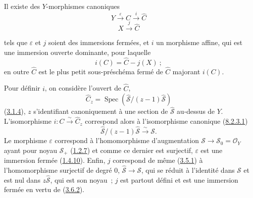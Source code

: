 \begin{proposition}[8.3.2]
\label{II.8.3.2-fr}
Il existe des $Y$-morphismes canoniques
\begin{equation}
\label{II.8.3.2.1-fr}
  Y\xrightarrow{\varepsilon}C\xrightarrow{i}\widehat{C}
\tag{8.3.2.1}
\end{equation}
\begin{equation}
\label{II.8.3.2.2-fr}
  X\xrightarrow{j}\widehat{C}
\tag{8.3.2.2}
\end{equation}

tels que $\varepsilon$ et $j$ soient des immersions fermées, et $i$ un
morphisme affine, qui est une immersion ouverte dominante, pour laquelle
\begin{equation}
\label{II.8.3.2.3-fr}
  i(C)=\widehat{C}-j(X)~;
\tag{8.3.2.3}
\end{equation}
en outre $\widehat{C}$ est le plus petit sous-préschéma fermé de $\widehat{C}$
majorant $i(C)$.
\end{proposition}

Pour définir $i$, on considère l'ouvert de $\widehat{C}$,
\begin{equation}
\label{II.8.3.2.4-fr}
  \widehat{C}_z=
  \operatorname{Spec}(\widehat{\mathcal{S}}/(z-1)\widehat{\mathcal{S}})
\tag{8.3.2.4}
\end{equation}
(\hyperref[II.3.1.4-fr]{3.1.4}), $z$ s'identifiant canoniquement à une
section de $\widehat{\mathcal{S}}$ au-dessus de $Y$. L'isomorphisme
$i:C\xrightarrow{\sim}\widehat{C}_z$ correspond alors à l'isomorphisme
canonique (\hyperref[II.8.2.3.1-fr]{8.2.3.1})
\[
  \widehat{\mathcal{S}}/(z-1)\widehat{\mathcal{S}}
  \xrightarrow{\sim}\mathcal{S}.
\]
Le morphisme $\varepsilon$ correspond à l'homomorphisme d'augmentation
$\mathcal{S}\to\mathcal{S}_0=\mathcal{O}_Y$ ayant pour noyau
$\mathcal{S}_+$ (\hyperref[II.1.2.7-fr]{1.2.7}) et comme ce dernier est
surjectif, $\varepsilon$ est une immersion fermée
(\hyperref[II.1.4.10-fr]{1.4.10}). Enfin, $j$ correspond de même
(\hyperref[II.3.5.1-fr]{3.5.1}) à l'homomorphisme surjectif de degré $0$,
$\widehat{\mathcal{S}}\to\mathcal{S}$, qui se réduit à l'identité dans
$\mathcal{S}$ et est nul dans $z\widehat{\mathcal{S}}$, qui est son noyau~;
$j$ est partout défini et est une immersion fermée en vertu de
(\hyperref[II.3.6.2-fr]{3.6.2}).

